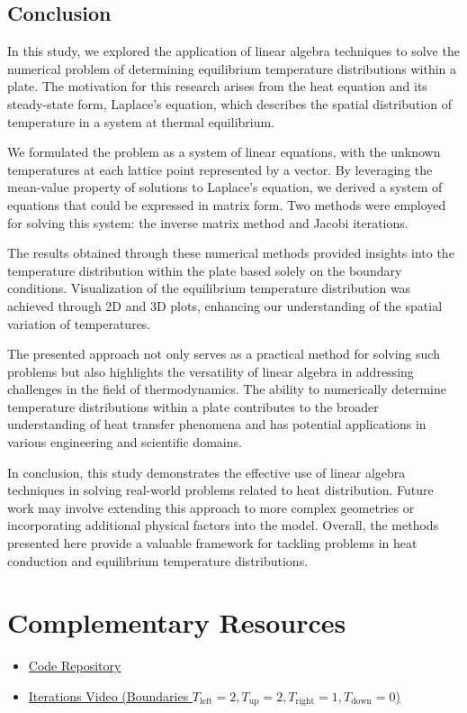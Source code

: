 \documentclass{article}
\begin{document}
\begin{multicols}{2}
  
\section{Conclusion}
In this study, we explored the application of linear algebra techniques to
solve the numerical problem of determining equilibrium temperature
distributions within a plate. The motivation for this research arises from the
heat equation and its steady-state form, Laplace's equation, which describes
the spatial distribution of temperature in a system at thermal equilibrium.

We formulated the problem as a system of linear equations, with the unknown
temperatures at each lattice point represented by a vector. By leveraging the
mean-value property of solutions to Laplace's equation, we derived a system of
equations that could be expressed in matrix form. Two methods were employed for
solving this system: the inverse matrix method and Jacobi iterations.

The results obtained through these numerical methods provided insights into the
temperature distribution within the plate based solely on the boundary
conditions. Visualization of the equilibrium temperature distribution was
achieved through 2D and 3D plots, enhancing our understanding of the spatial
variation of temperatures.

The presented approach not only serves as a practical method for solving such
problems but also highlights the versatility of linear algebra in addressing
challenges in the field of thermodynamics. The ability to numerically determine
temperature distributions within a plate contributes to the broader
understanding of heat transfer phenomena and has potential applications in
various engineering and scientific domains.

In conclusion, this study demonstrates the effective use of linear algebra
techniques in solving real-world problems related to heat distribution. Future
work may involve extending this approach to more complex geometries or
incorporating additional physical factors into the model. Overall, the methods
presented here provide a valuable framework for tackling problems in heat
conduction and equilibrium temperature distributions.
\end{multicols}

\printbibliography[title=References, heading=bibnumbered]

\appendix
\section{Complementary Resources}
\begin{itemize}
  \item \href{https://github.com/salastro/etd-la}{Code Repository}
  \item \href{https://youtu.be/Zn6hnecikcc}{Iterations Video (Boundaries $T_{\text{left}}=2,
    T_{\text{up}}=2, T_{\text{right}}=1, T_{\text{down}}=0$)}
\end{itemize}
\end{document}
